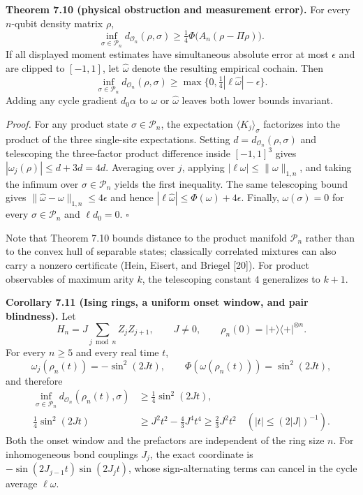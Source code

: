 \documentclass[
  11pt,
]{article}
\begin{document}
\textbf{Theorem 7.10 (physical obstruction and measurement error).} For every \(n\)-qubit density matrix \(\rho\),
\[
 \boxed{\quad
 \inf_{\sigma\in\mathcal P_n}d_{\mathcal O_n}(\rho,\sigma)
       \ge\tfrac14\Phi\bigl(A_n(\rho-\Pi\rho)\bigr).
 \quad}
\]
If all displayed moment estimates have simultaneous absolute error at most \(\epsilon\) and are clipped to \([-1,1]\), let \(\widehat\omega\) denote the resulting empirical cochain. Then
\[
 \inf_{\sigma\in\mathcal P_n}d_{\mathcal O_n}(\rho,\sigma)
 \ge \max\{0,\tfrac14|\ell\widehat\omega|-\epsilon\}.
\]
Adding any cycle gradient \(d_0\alpha\) to \(\omega\) or \(\widehat\omega\) leaves both lower bounds invariant.

\emph{Proof.} For any product state \(\sigma \in \mathcal P_n\), the expectation \(\langle K_j\rangle_\sigma\) factorizes into the product of the three single-site expectations. Setting \(d=d_{\mathcal O_n}(\rho,\sigma)\) and telescoping the three-factor product difference inside \([-1,1]^3\) gives \(|\omega_j(\rho)|\le d+3d=4d\). Averaging over \(j\), applying \(|\ell\omega|\le\lVert \omega\rVert_{1,n}\), and taking the infimum over \(\sigma\in\mathcal P_n\) yields the first inequality. The same telescoping bound gives \(\lVert \widehat\omega-\omega\rVert_{1,n}\le4\epsilon\) and hence \(|\ell\widehat\omega|\le\Phi(\omega)+4\epsilon\). Finally, \(\omega(\sigma)=0\) for every \(\sigma\in\mathcal P_n\) and \(\ell d_0=0\). \(\square\)

Note that Theorem 7.10 bounds distance to the product manifold \(\mathcal P_n\) rather than to the convex hull of separable states; classically correlated mixtures can also carry a nonzero certificate (Hein, Eisert, and Briegel {[}20{]}). For product observables of maximum arity \(k\), the telescoping constant \(4\) generalizes to \(k+1\).

\textbf{Corollary 7.11 (Ising rings, a uniform onset window, and pair blindness).}
Let
\[
 H_n=J\sum_{j\bmod n}Z_jZ_{j+1},\qquad J\ne0,\qquad
 \rho_n(0)=|+\rangle\langle+|^{\otimes n}.
\]
For every \(n\ge5\) and every real time \(t\),
\[
 \omega_j(\rho_n(t))=-\sin^2(2Jt),\qquad
 \Phi(\omega(\rho_n(t)))=\sin^2(2Jt),
\]
and therefore
\[
 \begin{aligned}
 \inf_{\sigma\in\mathcal P_n}d_{\mathcal O_n}(\rho_n(t),\sigma)
 &\ge\tfrac14\sin^2(2Jt),\\
 \tfrac14\sin^2(2Jt)&\ge J^2t^2-\tfrac43J^4t^4
 \ge\tfrac23J^2t^2
 \quad (|t|\le(2|J|)^{-1}).
 \end{aligned}
\]
Both the onset window and the prefactors are independent of the ring size \(n\). For inhomogeneous bond couplings \(J_j\), the exact coordinate is \(-\sin(2J_{j-1}t)\sin(2J_jt)\), whose sign-alternating terms can cancel in the cycle average \(\ell\omega\).
\end{document}
